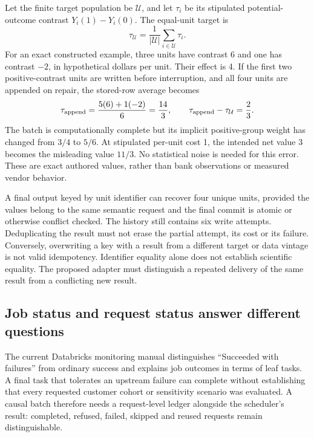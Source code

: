 Let the finite target population be $\mathcal U$, and let $\tau_i$ be its
stipulated potential-outcome contrast $Y_i(1)-Y_i(0)$. The equal-unit target is
\begin{equation}
 \tau_{\mathcal U}=\frac{1}{|\mathcal U|}\sum_{i\in\mathcal U}\tau_i.
 \label{exec22:workflow-target}
\end{equation}
For an exact constructed example, three units have contrast 6 and one has
contrast $-2$, in hypothetical dollars per unit. Their effect is 4. If the
first two positive-contrast units are written before interruption, and all
four units are appended on repair, the stored-row average becomes
\begin{equation}
 \tau_{\rm append}=\frac{5(6)+1(-2)}{6}=\frac{14}{3},
 \qquad \tau_{\rm append}-\tau_{\mathcal U}=\frac{2}{3}.
 \label{exec22:workflow-duplicates}
\end{equation}
The batch is computationally complete but its implicit positive-group weight
has changed from $3/4$ to $5/6$. At stipulated per-unit cost 1, the intended
net value 3 becomes the misleading value $11/3$. No statistical noise is
needed for this error. These are exact authored values, rather than bank
observations or measured vendor behavior.\citep{exec22_workflow_reference}

A final output keyed by unit identifier can recover four unique units, provided
the values belong to the same semantic request and the final commit is atomic
or otherwise conflict checked. The history still contains six write attempts.
Deduplicating the result must not erase the partial attempt, its cost or its
failure. Conversely, overwriting a key with a result from a different target
or data vintage is not valid idempotency. Identifier equality alone does not
establish scientific equality. The proposed adapter must distinguish a repeated
delivery of the same result from a conflicting new result.

\subsection{Job status and request status answer different questions}

The current Databricks monitoring manual distinguishes ``Succeeded with
failures'' from ordinary success and explains job outcomes in terms of leaf
tasks. A final task that tolerates an upstream failure can complete without
establishing that every requested customer cohort or sensitivity scenario was
evaluated. A causal batch therefore needs a request-level ledger alongside the
scheduler's result: completed, refused, failed, skipped and reused requests
remain distinguishable.\citep{exec22_workflow_databricks_monitor}

